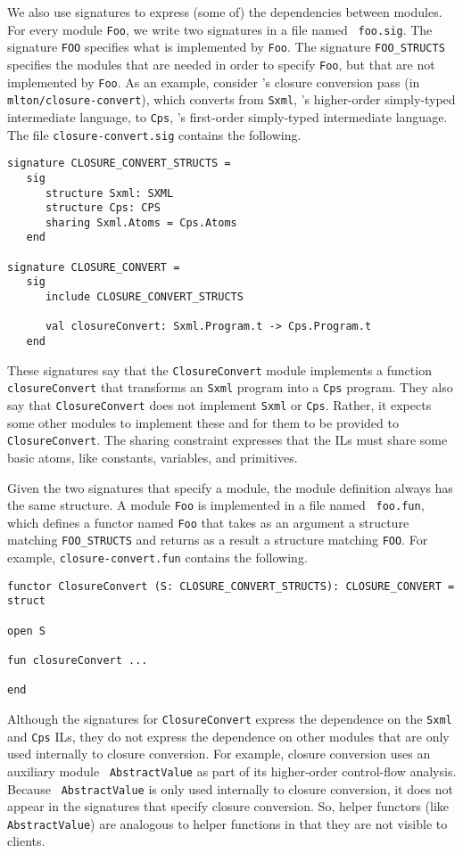 \documentclass[12pt]{article}
\begin{document}
We also use signatures to express (some of) the dependencies between modules.
For every module {\tt Foo}, we write two signatures in a file named {\tt
foo.sig}.  The signature {\tt FOO} specifies what is implemented by {\tt Foo}.
The signature {\tt FOO\_STRUCTS} specifies the modules that are needed in order
to specify {\tt Foo}, but that are not implemented by {\tt Foo}.  As an example,
consider {\mlton}'s closure conversion pass (in {\tt mlton/closure-convert}),
which converts from {\tt Sxml}, {\mlton}'s higher-order simply-typed
intermediate language, to {\tt Cps}, {\mlton}'s first-order simply-typed
intermediate language.  The file {\tt closure-convert.sig} contains the
following.
\begin{verbatim}
signature CLOSURE_CONVERT_STRUCTS = 
   sig
      structure Sxml: SXML
      structure Cps: CPS
      sharing Sxml.Atoms = Cps.Atoms
   end

signature CLOSURE_CONVERT = 
   sig
      include CLOSURE_CONVERT_STRUCTS
      
      val closureConvert: Sxml.Program.t -> Cps.Program.t
   end
\end{verbatim}
These signatures say that the {\tt ClosureConvert} module implements a function
{\tt closureConvert} that transforms an {\tt Sxml} program into a {\tt Cps}
program.  They also say that {\tt ClosureConvert} does not implement {\tt Sxml}
or {\tt Cps}.  Rather, it expects some other modules to implement these and for
them to be provided to {\tt ClosureConvert}.  The sharing constraint expresses
that the ILs must share some basic atoms, like constants, variables, and
primitives.

Given the two signatures that specify a module, the module definition always has
the same structure.  A module {\tt Foo} is implemented in a file named {\tt
foo.fun}, which defines a functor named {\tt Foo} that takes as an argument a
structure matching {\tt FOO\_STRUCTS} and returns as a result a structure
matching {\tt FOO}.  For example, {\tt closure-convert.fun} contains the
following.
\begin{verbatim}
functor ClosureConvert (S: CLOSURE_CONVERT_STRUCTS): CLOSURE_CONVERT = 
struct

open S

fun closureConvert ...

end
\end{verbatim}
Although the signatures for {\tt ClosureConvert} express the dependence
on the {\tt Sxml} and {\tt Cps} ILs, they do not express the
dependence on other modules that are only used internally to closure
conversion.  For example, closure conversion uses an auxiliary module {\tt
AbstractValue} as part of its higher-order control-flow analysis.  Because {\tt
AbstractValue} is only used internally to closure conversion, it does not appear
in the signatures that specify closure conversion.  So, helper functors (like
{\tt AbstractValue}) are analogous to helper functions in that they are not
visible to clients.
\end{document}
